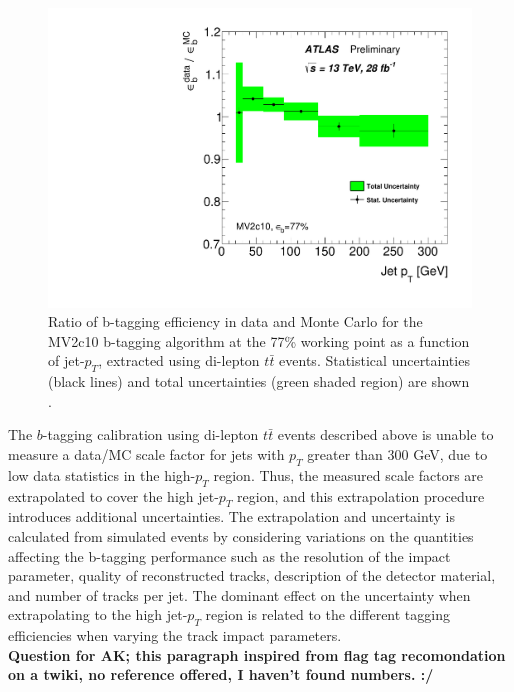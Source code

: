 \begin{figure}[!ht]
  \captionsetup[subfigure]{aboveskip=-5pt,justification=centering}
  \begin{center}
    \includegraphics[width=0.7\linewidth, angle=0]{figs/Objects/bjets_calib_pt.pdf} 
  \end{center}
  \caption[Ratio of b-tagging efficiency in data and Monte Carlo for the MV2c10 b-tagging algorithm at the 77\% working point as a function of jet-$p_T$,
    extracted using di-lepton $t\bar{t}$ events. Statistical uncertainties (black lines) and total uncertainties (green shaded region) are shown.]
          {Ratio of b-tagging efficiency in data and Monte Carlo for the MV2c10 b-tagging algorithm at the 77\% working point as a function of jet-$p_T$,
    extracted using di-lepton $t\bar{t}$ events. Statistical uncertainties (black lines) and total uncertainties (green shaded region) are shown \cite{obj-bjets_calib_plots}.}
  \label{fig:obj-bjets_calib}
\end{figure}

The $b$-tagging calibration using di-lepton $t\bar{t}$ events described above
is unable to measure a data/MC scale factor for jets with $p_T$ greater than 300 GeV, due to low data statistics in the high-$p_T$ region.
Thus, the measured scale factors are extrapolated to cover the high jet-$p_T$ region, and this extrapolation procedure introduces additional uncertainties.
The extrapolation and uncertainty is calculated from simulated events by considering variations on the quantities affecting the b-tagging performance
such as the resolution of the impact parameter, quality of reconstructed tracks, description of the detector material, and number of tracks per jet.
The dominant effect on the uncertainty when extrapolating to the high jet-$p_T$ region is related to the different tagging efficiencies
when varying the track impact parameters. \\
\textbf{Question for AK; this paragraph inspired from flag tag recomondation on a twiki, no reference offered, I haven't found numbers. :/}

